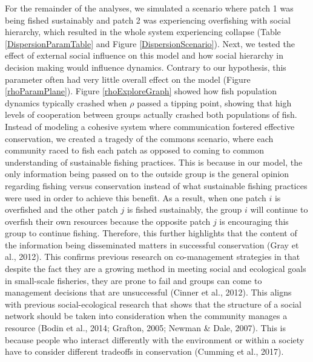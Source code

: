 \documentclass[
]{article}
\begin{document}
For the remainder of the analyses, we simulated a scenario where patch 1 was being fished sustainably and patch 2 was experiencing overfishing with social hierarchy, which resulted in the whole system experiencing collapse (Table \ref{DispersionParamTable} and Figure \ref{DispersionScenario}). Next, we tested the effect of external social influence on this model and how social hierarchy in decision making would influence dynamics. Contrary to our hypothesis, this parameter often had very little overall effect on the model (Figure \ref{rhoParamPlane}). Figure \ref{rhoExploreGraph} showed how fish population dynamics typically crashed when \(\rho\) passed a tipping point, showing that high levels of cooperation between groups actually crashed both populations of fish. Instead of modeling a cohesive system where communication fostered effective conservation, we created a tragedy of the commons scenario, where each community raced to fish each patch as opposed to coming to common understanding of sustainable fishing practices. This is because in our model, the only information being passed on to the outside group is the general opinion regarding fishing versus conservation instead of what sustainable fishing practices were used in order to achieve this benefit. As a result, when one patch \(i\) is overfished and the other patch \(j\) is fished sustainably, the group \(i\) will continue to overfish their own resources because the opposite patch \(j\) is encouraging this group to continue fishing. Therefore, this further highlights that the content of the information being disseminated matters in successful conservation (Gray et al., 2012). This confirms previous research on co-management strategies in that despite the fact they are a growing method in meeting social and ecological goals in small-scale fisheries, they are prone to fail and groups can come to management decisions that are unsuccessful (Cinner et al., 2012). This aligns with previous social-ecological research that shows that the structure of a social network should be taken into consideration when the community manages a resource (Bodin et al., 2014; Grafton, 2005; Newman \& Dale, 2007). This is because people who interact differently with the environment or within a society have to consider different tradeoffs in conservation (Cumming et al., 2017).
\end{document}
